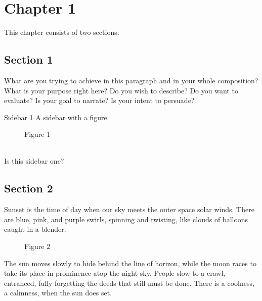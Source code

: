 \chapter{Chapter 1}
\label{chapter:1}

This chapter consists of two sections.

\section{Section 1}
\label{section:1}

What are you trying to achieve in this paragraph and in your whole composition? What is your purpose right here? Do you wish to describe? Do you want to evaluate? Is your goal to narrate? Is your intent to persuade?

\begin{sidebar}{Sidebar 1}
A sidebar with a figure.

\begin{figure}[]
\caption{Figure 1}
\label{fig:1} 
\end{figure}\\

Is this sidebar one?
\end{sidebar}

\section{Section 2}
\label{section:2}

Sunset is the time of day when our sky meets the outer space solar winds. There are blue, pink, and purple swirls, spinning and twisting, like clouds of balloons caught in a blender. 

\begin{figure}[]
\caption{Figure 2}
\label{fig:2}
\end{figure}

The sun moves slowly to hide behind the line of horizon, while the moon races to take its place in prominence atop the night sky. People slow to a crawl, entranced, fully forgetting the deeds that still must be done. There is a coolness, a calmness, when the sun does set.
